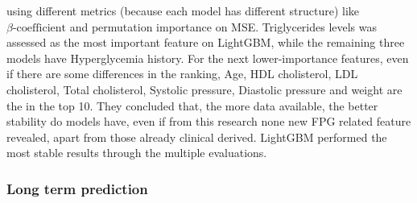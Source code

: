 \documentclass[journal,article,submit,pdftex,moreauthors]{Definitions/mdpi}
\begin{document}
using different metrics (because each model has different structure) like 
$\beta \textrm{-coefficient}$ and permutation importance on MSE.
Triglycerides levels was assessed as the most important feature on
LightGBM, while the remaining  three models have Hyperglycemia history. For the
next lower-importance features, even if there are some differences in the ranking,
Age, HDL cholisterol, LDL cholisterol, Total cholisterol, Systolic pressure, Diastolic
pressure and weight are the in the top 10.  They concluded that, the more data 
available, the better stability do models have, even if from this research none
new FPG related feature revealed, apart from those already clinical derived. LightGBM
performed the most stable results through the multiple evaluations.


\subsubsection{Long term prediction}
\end{document}
